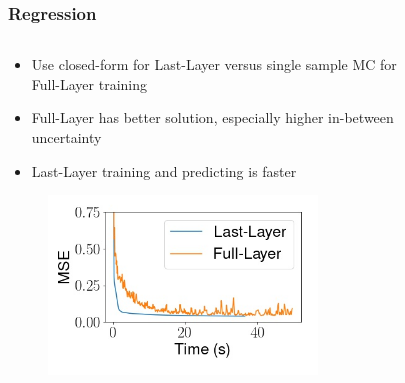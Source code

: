 \documentclass{beamer}
\begin{document}
        \begin{frame}
            \frametitle{Regression}
            \begin{columns}
                \begin{column}{0.6\textwidth}
                \begin{itemize}
                    \item Use closed-form for Last-Layer versus single sample MC for Full-Layer training
                    \item Full-Layer has better solution, especially higher in-between uncertainty
                    \item Last-Layer training and predicting is faster
                \end{itemize}
                \begin{figure}
                    \includegraphics[width=0.8\textwidth]{images/Regression/LLvsFullMSE.jpg}
                \end{figure}
                \end{column}
                \begin{column}{0.4\textwidth}
                    \begin{figure}
                        \vspace*{-2cm}

\end{figure}
\end{column}
\end{columns}
\end{frame}
\end{document}
